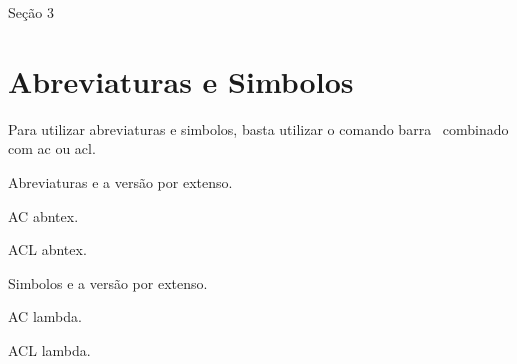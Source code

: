 		Seção 3
		
	\section{Abreviaturas e Simbolos}
	
	 Para utilizar abreviaturas e simbolos, basta utilizar o comando barra \ combinado com ac ou acl.
	 
	 Abreviaturas e a versão por extenso.
	 
	 AC \ac{abntex}.
	 
	 ACL \acl{abntex}.
	 
	 Simbolos e a versão por extenso.
	 
	 AC  \ac{lambda}.
	 
	 ACL \acl{lambda}.

